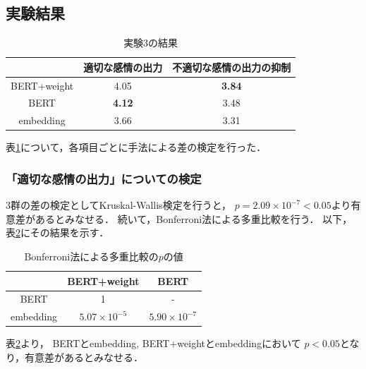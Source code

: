 	\subsection{実験結果}
	\begin{table}[H]
		\centering
		\caption{実験3の結果}
		\label{kansei_tagigo_result}
			\begin{tabular}{ccc}
				\hline
				& 適切な感情の出力 & 不適切な感情の出力の抑制 \\
				\hline \hline
				BERT+weight & 4.05 & \textbf{3.84} \\
				BERT & \textbf{4.12} & 3.48 \\
				embedding & 3.66 & 3.31 \\
				\hline
			\end{tabular}
	\end{table}

	表\ref{kansei_tagigo_result}について，各項目ごとに手法による差の検定を行った．
	\subsubsection{「適切な感情の出力」についての検定}
		3群の差の検定としてKruskal-Wallis検定を行うと，
		$p=2.09\times10^{-7}<0.05$より有意差があるとみなせる．
		続いて，Bonferroni法による多重比較を行う．
		以下，表\ref{table:jikken3_good_Bonferroni}にその結果を示す．
		\begin{table}[H]
			\centering
			\caption{Bonferroni法による多重比較の$p$の値}
			\label{table:jikken3_good_Bonferroni}
			\begin{tabular}{|c|c|c|}
				\hline
				& BERT+weight & BERT \\
				\hline
				BERT & 1 & - \\
				\hline
				embedding & $5.07\times10^{-5}$ & $5.90\times10^{-7}$ \\
				\hline
			\end{tabular}
		\end{table}
		表\ref{table:jikken3_good_Bonferroni}より，
		BERTとembedding, BERT+weightとembeddingにおいて
		$p<0.05$となり，有意差があるとみなせる．

